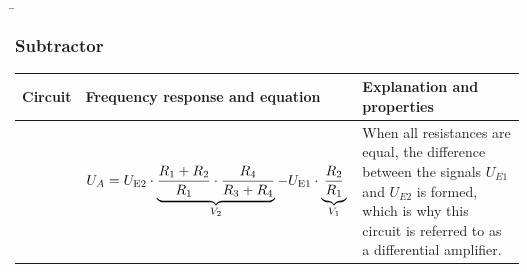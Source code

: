 \begin{frame}
    \b{
    \frametitle{Subtractor}
    \centering
    \begin{table}[ht]
    \label{tab:Subtrahierer}
    \begin{tabular}{|m{}|m{}|m{}|}
    \hline
    Circuit & Frequency response and equation & Explanation and properties\\ %
    \hline
    \vspace{0.5cm}
    \centering
    
      &
      \begin{center}
      
 \end{center}
 \vspace{1ex}
 \[
 \begin{aligned}
    {U_A} = {U_{{\textnormal{E2}}}} \cdot \underbrace{ \frac{R_1 + R_2}{R_1} \cdot \frac{R_4}{R_3 + R_4}}_{V_2} - U_{\textnormal{E1}} \cdot \underbrace{\frac{R_2}{R_1}}_{V_1}
\end{aligned}
 \]
     &
    When all resistances are equal, the difference between the signals $U_{E1}$ and $U_{E2}$ is formed, which is why this circuit is referred to as a differential amplifier. \\
    \hline
    \end{tabular}
    \end{table}
    }
\end{frame}

